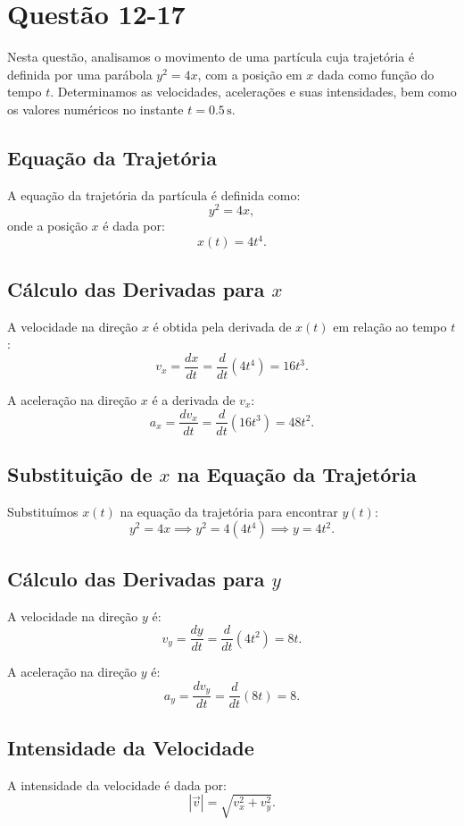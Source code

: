 \section{Questão 12-17}

Nesta questão, analisamos o movimento de uma partícula cuja trajetória é definida por uma parábola \(y^2 = 4x\), com a posição em \(x\) dada como função do tempo \(t\). Determinamos as velocidades, acelerações e suas intensidades, bem como os valores numéricos no instante \(t = 0.5 \, \text{s}\).

\subsection*{Equação da Trajetória}
A equação da trajetória da partícula é definida como:
\[
y^2 = 4x,
\]
onde a posição \(x\) é dada por:
\[
x(t) = 4t^4.
\]

\subsection*{Cálculo das Derivadas para \(x\)}
A velocidade na direção \(x\) é obtida pela derivada de \(x(t)\) em relação ao tempo \(t\):
\[
v_x = \frac{dx}{dt} = \frac{d}{dt}\left(4t^4\right) = 16t^3.
\]

A aceleração na direção \(x\) é a derivada de \(v_x\):
\[
a_x = \frac{dv_x}{dt} = \frac{d}{dt}\left(16t^3\right) = 48t^2.
\]

\subsection*{Substituição de \(x\) na Equação da Trajetória}
Substituímos \(x(t)\) na equação da trajetória para encontrar \(y(t)\):
\[
y^2 = 4x \implies y^2 = 4(4t^4) \implies y = 4t^2.
\]

\subsection*{Cálculo das Derivadas para \(y\)}
A velocidade na direção \(y\) é:
\[
v_y = \frac{dy}{dt} = \frac{d}{dt}\left(4t^2\right) = 8t.
\]

A aceleração na direção \(y\) é:
\[
a_y = \frac{dv_y}{dt} = \frac{d}{dt}\left(8t\right) = 8.
\]

\subsection*{Intensidade da Velocidade}
A intensidade da velocidade é dada por:
\[
|\vec{v}| = \sqrt{v_x^2 + v_y^2}.
\]

